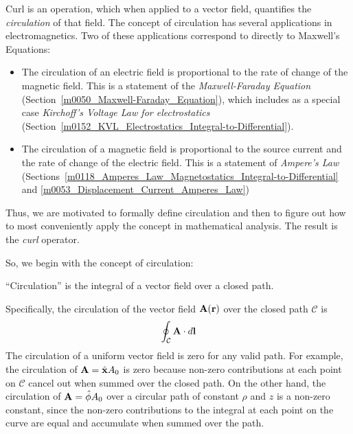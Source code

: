 

\label{m0048_Curl} %


Curl is an operation, which when applied to a vector field, quantifies the \emph{circulation} of that field.
The concept of circulation has several applications in electromagnetics.
Two of these applications correspond to directly to Maxwell's Equations:
%
\begin{itemize}
\item The circulation of an electric field is proportional to the rate of change of the magnetic field.  This is a statement of the \emph{Maxwell-Faraday Equation} 
(Section~\ref{m0050_Maxwell-Faraday_Equation}), which includes as a special case \emph{Kirchoff's Voltage Law for electrostatics} 
(Section~\ref{m0152_KVL_Electrostatics_Integral-to-Differential}).
\item The circulation of a magnetic field is proportional to the source current and the rate of change of the electric field.  This is a statement of \emph{Ampere's Law} 
(Sections~\ref{m0118_Amperes_Law_Magnetostatics_Integral-to-Differential} and \ref{m0053_Displacement_Current_Amperes_Law})
\end{itemize}
%
Thus, we are motivated to formally define circulation and then to figure out how to most conveniently apply the concept in mathematical analysis.  The result is the \emph{curl} operator.   

So, we begin with the concept of circulation:
%
\begin{mdframed}[backgroundcolor=yellow!20,nobreak=true] 
``Circulation'' is the integral of a vector field over a closed path.
\end{mdframed}
%
Specifically, the circulation of the vector field ${\bf A}({\bf r})$ over the closed path ${\mathcal C}$ is
%
\begin{equation}
\oint_{\mathcal C} {\bf A}\cdot d{\bf l}
\end{equation}
%
The circulation of a uniform vector field is zero for any valid path. 
For example, the circulation of ${\bf A}=\hat{\bf x}A_0$ is zero because non-zero contributions at each point on ${\mathcal C}$ cancel out when summed over the closed path.
On the other hand, the circulation of ${\bf A}=\hat{\bf \phi}A_0$ over a circular path of constant $\rho$ and $z$ is a non-zero constant, since the non-zero contributions to the integral at each point on the curve are equal and accumulate when summed over the path. 


